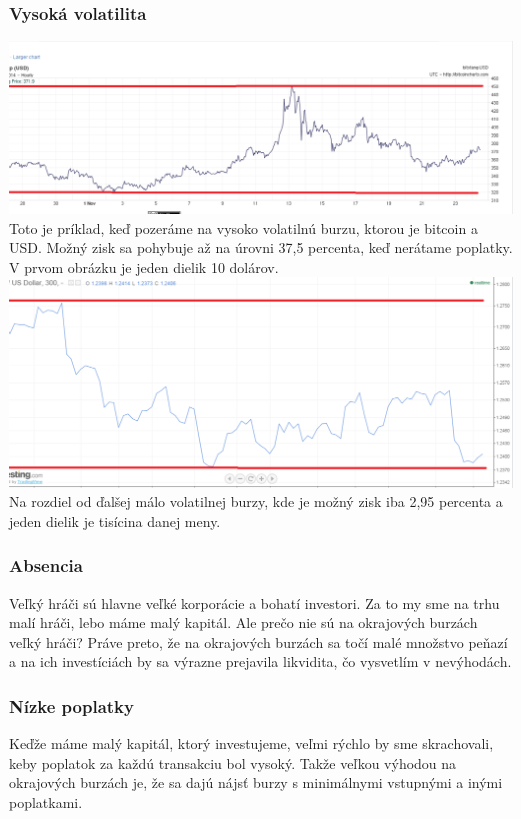 \subsubsection{Vysoká volatilita} 
\includegraphics[width=1\textwidth]{obr} 
Toto je príklad, keď pozeráme na vysoko volatilnú burzu, ktorou je bitcoin a USD. Možný zisk sa pohybuje až na úrovni 37,5 percenta, keď nerátame poplatky. V prvom obrázku je jeden dielik 10 dolárov. 
\\ 
\includegraphics[width=1\textwidth]{obr2} 
Na rozdiel od ďalšej málo volatilnej burzy, kde je  možný zisk iba 2,95 percenta a jeden dielik je tisícina danej meny. 
\subsubsection{Absencia } 
Veľký hráči\cite{ZAC} sú hlavne veľké korporácie a bohatí investori. Za to my sme na trhu malí hráči, lebo máme malý kapitál. Ale prečo nie sú na okrajových burzách veľký hráči? Práve preto, že na okrajových burzách sa točí malé množstvo peňazí a na ich investíciách by sa výrazne prejavila likvidita, čo vysvetlím v nevýhodách. 
\subsubsection{Nízke poplatky} 
Keďže máme malý kapitál, ktorý investujeme, veľmi rýchlo by sme skrachovali, keby poplatok za každú transakciu  bol vysoký. Takže veľkou výhodou na okrajových burzách je, že sa dajú nájsť burzy s minimálnymi vstupnými a inými poplatkami. 
